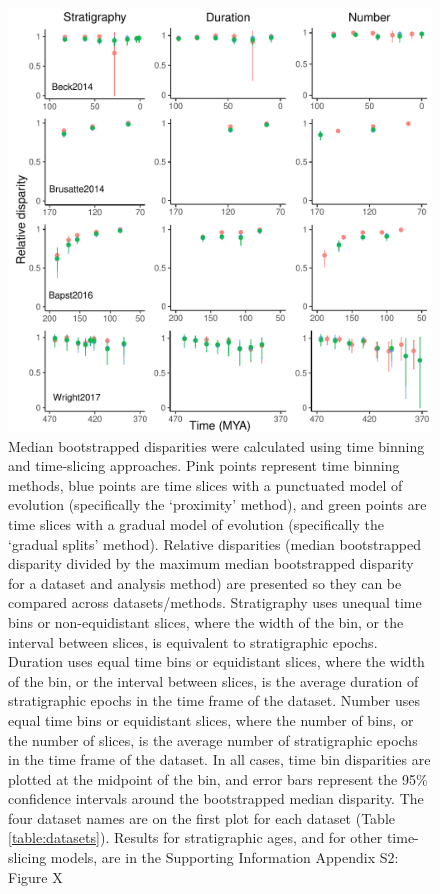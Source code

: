 \documentclass[12pt,a4paper]{article}
\begin{document}
  \begin{figure}[!htbp]
    \centering
    \includegraphics[width=1\linewidth, height=1\textheight, keepaspectratio]{figures/fig-dtt-epoch.pdf}
    \caption[Relative disparity through time for four example datasets.]
    {Median bootstrapped disparities were calculated using time binning and time-slicing approaches. 
    Pink points represent time binning methods, blue points are time slices with a punctuated model of evolution (specifically the `proximity' method), and green points are time slices with a gradual model of evolution (specifically the `gradual splits' method).
    Relative disparities (median bootstrapped disparity divided by the maximum median bootstrapped disparity for a dataset and analysis method) are presented so they can be compared across datasets/methods. 
    Stratigraphy uses unequal time bins or non-equidistant slices, where the width of the bin, or the interval between slices, is equivalent to stratigraphic epochs. 
    Duration uses equal time bins or equidistant slices, where the width of the bin, or the interval between slices, is the average duration of stratigraphic epochs in the time frame of the dataset. 
    Number uses equal time bins or equidistant slices, where the number of bins, or the number of slices, is the average number of stratigraphic epochs in the time frame of the dataset. 
    In all cases, time bin disparities are plotted at the midpoint of the bin, and error bars represent the 95\% confidence intervals around the bootstrapped median disparity.
    The four dataset names are on the first plot for each dataset (Table \ref{table:datasets}).
    Results for stratigraphic ages, and for other time-slicing models, are in the Supporting Information Appendix S2: Figure X} %
    \label{figure:dtt1}
  \end{figure}
\end{document}
